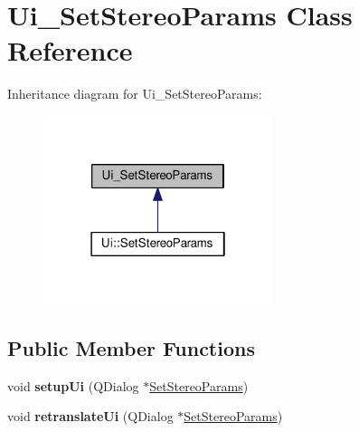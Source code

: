 \hypertarget{class_ui___set_stereo_params}{}\section{Ui\+\_\+\+Set\+Stereo\+Params Class Reference}
\label{class_ui___set_stereo_params}


Inheritance diagram for Ui\+\_\+\+Set\+Stereo\+Params\+:
\nopagebreak
\begin{figure}[H]
\begin{center}
\leavevmode
\includegraphics[width=190pt]{class_ui___set_stereo_params__inherit__graph}
\end{center}
\end{figure}
\subsection*{Public Member Functions}
\begin{DoxyCompactItemize}
\item 
void {\bfseries setup\+Ui} (Q\+Dialog $\ast$\hyperlink{class_set_stereo_params}{Set\+Stereo\+Params})\hypertarget{class_ui___set_stereo_params_a14abad600eb358910e00beda2062ce70}{}\label{class_ui___set_stereo_params_a14abad600eb358910e00beda2062ce70}

\item 
void {\bfseries retranslate\+Ui} (Q\+Dialog $\ast$\hyperlink{class_set_stereo_params}{Set\+Stereo\+Params})\hypertarget{class_ui___set_stereo_params_a10deece6ae48222b69698c6cf37d463a}{}\label{class_ui___set_stereo_params_a10deece6ae48222b69698c6cf37d463a}

\end{DoxyCompactItemize}
